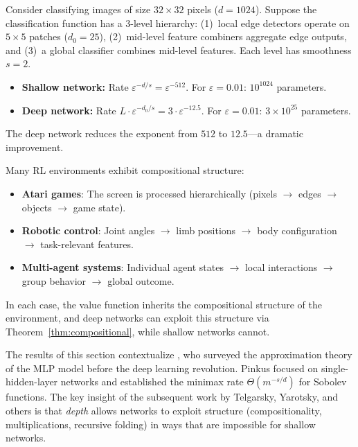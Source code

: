 \documentclass[11pt,a4paper]{article}
\begin{document}
\begin{example}
\label{ex:vision}
Consider classifying images of size $32 \times 32$ pixels ($d = 1024$).
Suppose the classification function has a $3$-level hierarchy:
(1)~local edge detectors operate on $5 \times 5$ patches ($d_0 = 25$),
(2)~mid-level feature combiners aggregate edge outputs, and
(3)~a global classifier combines mid-level features.  Each level has
smoothness $s = 2$.

\begin{itemize}[nosep]
  \item \textbf{Shallow network:} Rate $\varepsilon^{-d/s} =
    \varepsilon^{-512}$.  For $\varepsilon = 0.01$: $10^{1024}$
    parameters.
  \item \textbf{Deep network:} Rate $L \cdot \varepsilon^{-d_0/s} =
    3 \cdot \varepsilon^{-12.5}$.  For $\varepsilon = 0.01$:
    $3 \times 10^{25}$ parameters.
\end{itemize}
The deep network reduces the exponent from $512$ to $12.5$---a
dramatic improvement.
\end{example}

\begin{rlconnection}[title={Hierarchical Structure in RL}]
Many RL environments exhibit compositional structure:
\begin{itemize}[nosep]
  \item \textbf{Atari games}: The screen is processed hierarchically
    (pixels $\to$ edges $\to$ objects $\to$ game state).
  \item \textbf{Robotic control}: Joint angles $\to$ limb positions
    $\to$ body configuration $\to$ task-relevant features.
  \item \textbf{Multi-agent systems}: Individual agent states $\to$
    local interactions $\to$ group behavior $\to$ global outcome.
\end{itemize}
In each case, the value function inherits the compositional structure
of the environment, and deep networks can exploit this structure via
Theorem~\ref{thm:compositional}, while shallow networks cannot.
\end{rlconnection}

\begin{remark}
\label{rem:pinkus-context}
The results of this section contextualize \citet{pinkus1999}, who
surveyed the approximation theory of the MLP model before the deep
learning revolution.  Pinkus focused on single-hidden-layer networks
and established the minimax rate $\Theta(m^{-s/d})$ for Sobolev
functions.  The key insight of the subsequent work by Telgarsky,
Yarotsky, and others is that \emph{depth} allows networks to
exploit structure (compositionality, multiplications, recursive
folding) in ways that are impossible for shallow networks.
\end{remark}
\end{document}
